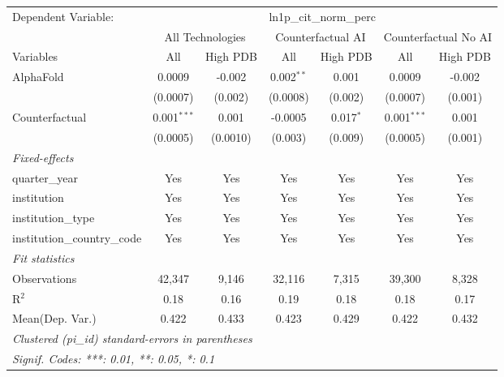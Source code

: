 \begingroup
\centering
\begin{tabular}{lcccccc}
   \tabularnewline \midrule \midrule
   Dependent Variable: & \multicolumn{6}{c}{ln1p\_cit\_norm\_perc}\\
 & \multicolumn{2}{c}{All Technologies} & \multicolumn{2}{c}{Counterfactual AI} & \multicolumn{2}{c}{Counterfactual No AI} \\
\cmidrule(lr){1-1}\cmidrule(lr){2-3} \cmidrule(lr){4-5} \cmidrule(lr){6-7}
Variables & \multicolumn{1}{c}{All} & \multicolumn{1}{c}{High PDB} & \multicolumn{1}{c}{All} & \multicolumn{1}{c}{High PDB} & \multicolumn{1}{c}{All} & \multicolumn{1}{c}{High PDB} \\
\cmidrule(lr){1-1}\cmidrule(lr){2-2} \cmidrule(lr){3-3} \cmidrule(lr){4-4} \cmidrule(lr){5-5} \cmidrule(lr){6-6} \cmidrule(lr){7-7}
   AlphaFold                    & 0.0009        & -0.002   & 0.002$^{**}$ & 0.001       & 0.0009        & -0.002\\   
                                & (0.0007)      & (0.002)  & (0.0008)     & (0.002)     & (0.0007)      & (0.001)\\   
   Counterfactual               & 0.001$^{***}$ & 0.001    & -0.0005      & 0.017$^{*}$ & 0.001$^{***}$ & 0.001\\   
                                & (0.0005)      & (0.0010) & (0.003)      & (0.009)     & (0.0005)      & (0.001)\\   
   \midrule
   \emph{Fixed-effects}\\
   quarter\_year                & Yes           & Yes      & Yes          & Yes         & Yes           & Yes\\  
   institution                  & Yes           & Yes      & Yes          & Yes         & Yes           & Yes\\  
   institution\_type            & Yes           & Yes      & Yes          & Yes         & Yes           & Yes\\  
   institution\_country\_code   & Yes           & Yes      & Yes          & Yes         & Yes           & Yes\\  
   \midrule
   \emph{Fit statistics}\\
   Observations                 & 42,347        & 9,146    & 32,116       & 7,315       & 39,300        & 8,328\\  
   R$^2$                        & 0.18          & 0.16     & 0.19         & 0.18        & 0.18          & 0.17\\  
Mean(Dep. Var.) & 0.422 & 0.433 & 0.423 & 0.429 & 0.422 & 0.432 \\
   \midrule \midrule
   \multicolumn{7}{l}{\emph{Clustered (pi\_id) standard-errors in parentheses}}\\
   \multicolumn{7}{l}{\emph{Signif. Codes: ***: 0.01, **: 0.05, *: 0.1}}\\
\end{tabular}
\par\endgroup
